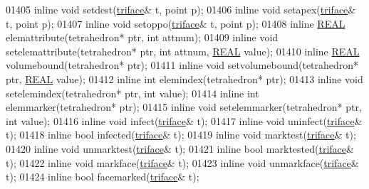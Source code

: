 \begin{DoxyCode}
01405   \textcolor{keyword}{inline} \textcolor{keywordtype}{void} setdest(\hyperlink{classtetgenmesh_1_1triface}{triface}& t, point p);
01406   \textcolor{keyword}{inline} \textcolor{keywordtype}{void} setapex(\hyperlink{classtetgenmesh_1_1triface}{triface}& t, point p);
01407   \textcolor{keyword}{inline} \textcolor{keywordtype}{void} setoppo(\hyperlink{classtetgenmesh_1_1triface}{triface}& t, point p);
01408   \textcolor{keyword}{inline} \hyperlink{tetgen_8h_a4b654506f18b8bfd61ad2a29a7e38c25}{REAL} elemattribute(tetrahedron* ptr, \textcolor{keywordtype}{int} attnum);
01409   \textcolor{keyword}{inline} \textcolor{keywordtype}{void} setelemattribute(tetrahedron* ptr, \textcolor{keywordtype}{int} attnum, \hyperlink{tetgen_8h_a4b654506f18b8bfd61ad2a29a7e38c25}{REAL} value);
01410   \textcolor{keyword}{inline} \hyperlink{tetgen_8h_a4b654506f18b8bfd61ad2a29a7e38c25}{REAL} volumebound(tetrahedron* ptr);
01411   \textcolor{keyword}{inline} \textcolor{keywordtype}{void} setvolumebound(tetrahedron* ptr, \hyperlink{tetgen_8h_a4b654506f18b8bfd61ad2a29a7e38c25}{REAL} value);
01412   \textcolor{keyword}{inline} \textcolor{keywordtype}{int}  elemindex(tetrahedron* ptr);
01413   \textcolor{keyword}{inline} \textcolor{keywordtype}{void} setelemindex(tetrahedron* ptr, \textcolor{keywordtype}{int} value);
01414   \textcolor{keyword}{inline} \textcolor{keywordtype}{int}  elemmarker(tetrahedron* ptr);
01415   \textcolor{keyword}{inline} \textcolor{keywordtype}{void} setelemmarker(tetrahedron* ptr, \textcolor{keywordtype}{int} value);
01416   \textcolor{keyword}{inline} \textcolor{keywordtype}{void} infect(\hyperlink{classtetgenmesh_1_1triface}{triface}& t);
01417   \textcolor{keyword}{inline} \textcolor{keywordtype}{void} uninfect(\hyperlink{classtetgenmesh_1_1triface}{triface}& t);
01418   \textcolor{keyword}{inline} \textcolor{keywordtype}{bool} infected(\hyperlink{classtetgenmesh_1_1triface}{triface}& t);
01419   \textcolor{keyword}{inline} \textcolor{keywordtype}{void} marktest(\hyperlink{classtetgenmesh_1_1triface}{triface}& t);
01420   \textcolor{keyword}{inline} \textcolor{keywordtype}{void} unmarktest(\hyperlink{classtetgenmesh_1_1triface}{triface}& t);
01421   \textcolor{keyword}{inline} \textcolor{keywordtype}{bool} marktested(\hyperlink{classtetgenmesh_1_1triface}{triface}& t);
01422   \textcolor{keyword}{inline} \textcolor{keywordtype}{void} markface(\hyperlink{classtetgenmesh_1_1triface}{triface}& t);
01423   \textcolor{keyword}{inline} \textcolor{keywordtype}{void} unmarkface(\hyperlink{classtetgenmesh_1_1triface}{triface}& t);
01424   \textcolor{keyword}{inline} \textcolor{keywordtype}{bool} facemarked(\hyperlink{classtetgenmesh_1_1triface}{triface}& t);

\end{DoxyCode}
